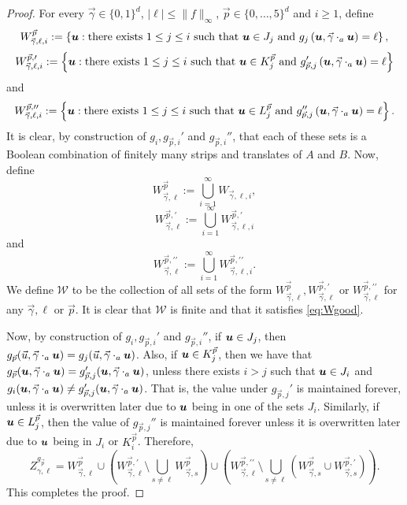 \documentclass[12pt,a4paper]{amsart}
\numberwithin{equation}{section}
\theoremstyle{definition}
\begin{document}
\begin{proof}
For every $\vec{\gamma}\in\{0,1\}^d$, $|\ell|\leq \|f\|_\infty$, $\vec{p}\in\{0,\dots,5\}^d$ and $i\geq1$, define
\[W^{\vec{p}}_{\vec{\gamma},\ell,i}:=\left\{\boldsymbol{u}: \text{there exists }1\leq j\leq i\text{ such that }\boldsymbol{u}\in J_j\text{ and }g_j\left(\boldsymbol{u},\vec{\gamma}\cdot_a\boldsymbol{u}\right)=\ell \right\},\]
\[W^{\vec{p},\prime}_{\vec{\gamma},\ell,i}:=\left\{\boldsymbol{u}: \text{there exists }1\leq j\leq i\text{ such that }\boldsymbol{u}\in K_j^{\vec{p}}\text{ and }g_{\vec{p},j}'\left(\boldsymbol{u},\vec{\gamma}\cdot_a\boldsymbol{u}\right)=\ell \right\}\]
and
\[W^{\vec{p},\prime\prime}_{\vec{\gamma},\ell,i}:=\left\{\boldsymbol{u}: \text{there exists }1\leq j\leq i\text{ such that }\boldsymbol{u}\in L_j^{\vec{p}}\text{ and }g_{\vec{p},j}''\left(\boldsymbol{u},\vec{\gamma}\cdot_a\boldsymbol{u}\right)=\ell \right\}.\]
It is clear, by construction of $g_i,g_{\vec{p},i}'$ and $g_{\vec{p},i}''$, that each of these sets is a Boolean combination of finitely many strips and translates of $A$ and $B$. Now, define
\[W^{\vec{p}}_{\vec{\gamma},\ell}:=\bigcup_{i=1}^\infty W_{\vec{\gamma},\ell,i},\]
\[W^{\vec{p},\prime}_{\vec{\gamma},\ell}:=\bigcup_{i=1}^\infty W^{\vec{p},\prime}_{\vec{\gamma},\ell,i}\]
and
\[W^{\vec{p},\prime\prime}_{\vec{\gamma},\ell}:=\bigcup_{i=1}^\infty W^{\vec{p},\prime\prime}_{\vec{\gamma},\ell,i}.\]
We define $\mathcal{W}$ to be the collection of all sets of the form $W^{\vec{p}}_{\vec{\gamma},\ell},W^{\vec{p},\prime}_{\vec{\gamma},\ell}$ or $W^{\vec{p},\prime\prime}_{\vec{\gamma},\ell}$ for any $\vec{\gamma},\ell$ or $\vec{p}$. It is clear that $\mathcal{W}$ is finite and that it satisfies \eqref{eq:Wgood}.

Now, by construction of $g_i,g_{\vec{p},i}'$ and $g_{\vec{p},i}''$, if $\boldsymbol{u}\in J_j$, then $g_{\vec{p}}(\vec{u},\vec{\gamma}\cdot_a\boldsymbol{u})=g_j(\vec{u},\vec{\gamma}\cdot_a\boldsymbol{u})$. Also, if $\boldsymbol{u}\in K_j^{\vec{p}}$, then we have that $g_{\vec{p}}(\boldsymbol{u},\vec{\gamma}\cdot_a\boldsymbol{u})=g_{\vec{p},j}'(\boldsymbol{u},\vec{\gamma}\cdot_a\boldsymbol{u})$, unless there exists $i>j$ such that $\boldsymbol{u}\in J_i$ and $g_i(\boldsymbol{u},\vec{\gamma}\cdot_a\boldsymbol{u})\neq  g_{\vec{p},j}'(\boldsymbol{u},\vec{\gamma}\cdot_a\boldsymbol{u})$. That is, the value under $g_{\vec{p},j}'$ is maintained forever, unless it is overwritten later due to $\boldsymbol{u}$ being in one of the sets $J_i$. Similarly, if $\boldsymbol{u}\in L_j^{\vec{p}}$, then the value of $g_{\vec{p},j}''$  is maintained forever unless it is overwritten later due to $\boldsymbol{u}$ being in $J_i$ or $K_i^{\vec{p}}$. Therefore,
\[Z_{\gamma,\ell}^{g_{\vec{p}}} = W^{\vec{p}}_{\vec{\gamma},\ell}\cup \left(W^{\vec{p},\prime}_{\vec{\gamma},\ell} \setminus \bigcup_{s\neq \ell}W^{\vec{p}}_{\vec{\gamma},s}\right)\cup \left(W^{\vec{p},\prime\prime}_{\vec{\gamma},\ell} \setminus \bigcup_{s\neq \ell}\left(W_{\vec{\gamma},s}^{\vec{p}}\cup W_{\vec{\gamma},s}^{\vec{p},\prime}\right)\right).\]
This completes the proof.
\end{proof}
\end{document}
